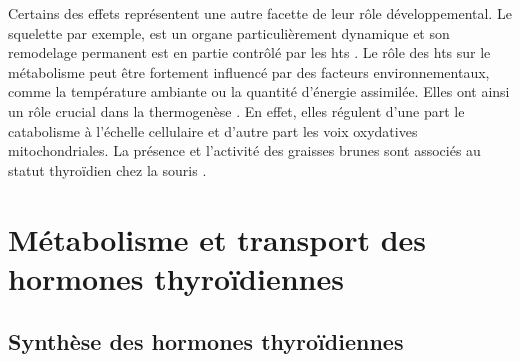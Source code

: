 \documentclass[../main.tex]{subfiles}
\begin{document}
Certains des effets représentent une autre facette de leur rôle développemental.
Le squelette par exemple, est un organe particulièrement dynamique et son remodelage permanent est en partie contrôlé par les \glspl{ht} \citep{Greenspan1999,Wojcicka2013a}.
Le rôle des \glspl{ht} sur le métabolisme peut être fortement influencé par des facteurs environnementaux, comme la température ambiante ou la quantité d'énergie assimilée.
Elles ont ainsi un rôle crucial dans la thermogenèse \citep{Bianco2005}.
En effet, elles régulent d'une part le catabolisme à l'échelle cellulaire et d'autre part les voix oxydatives mitochondriales. La présence et l'activité des graisses brunes sont associés au statut thyroïdien chez la souris \citep{Bianco2005}.






\section{Métabolisme et transport des hormones thyroïdiennes}\label{subsec:ht-metabolism}


\subsection{Synthèse des hormones thyroïdiennes}
\end{document}
